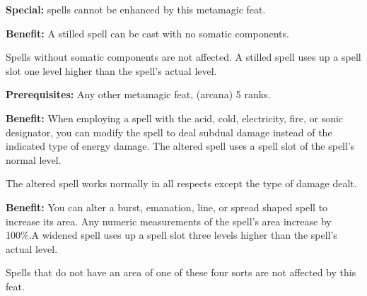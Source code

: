 \textbf{Special:}  spells cannot be enhanced by this metamagic feat.


\textbf{Benefit:} A stilled spell can be cast with no somatic components.

Spells without somatic components are not affected. A stilled spell uses up a spell 
slot one level higher than the spell's actual level.


\textbf{Prerequisites:} Any other metamagic feat,  (arcana) 5 ranks.

\textbf{Benefit:} When employing a spell with the acid, cold, electricity, fire, 
or sonic designator, you can modify the spell to deal subdual damage instead of 
the indicated type of energy damage. The altered spell uses a spell slot of the 
spell's normal level.

The altered spell works normally in all respects except the type of damage dealt.


\textbf{Benefit:} You can alter a burst, emanation, line, or spread shaped spell 
to increase its area. Any numeric measurements of the spell's area increase by 
100\%.A widened spell uses up a spell slot three levels higher than the spell's 
actual level.

Spells that do not have an area of one of these four sorts are not affected by 
this feat.

